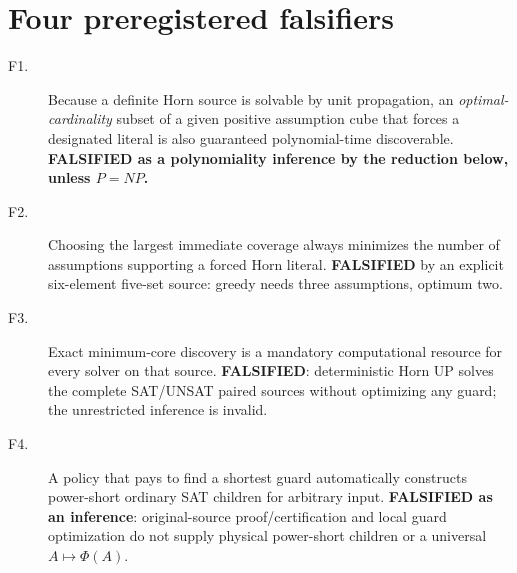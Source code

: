 \documentclass[11pt]{article}
\begin{document}
\section{Four preregistered falsifiers}
\begin{description}
\item[F1.] Because a definite Horn source is solvable by unit propagation, an \emph{optimal-cardinality} subset of a given positive assumption cube that forces a designated literal is also guaranteed polynomial-time discoverable. \textbf{FALSIFIED as a polynomiality inference by the reduction below, unless $P=NP$.}
\item[F2.] Choosing the largest immediate coverage always minimizes the number of assumptions supporting a forced Horn literal. \textbf{FALSIFIED} by an explicit six-element five-set source: greedy needs three assumptions, optimum two.
\item[F3.] Exact minimum-core discovery is a mandatory computational resource for every solver on that source. \textbf{FALSIFIED}: deterministic Horn UP solves the complete SAT/UNSAT paired sources without optimizing any guard; the unrestricted inference is invalid.
\item[F4.] A policy that pays to find a shortest guard automatically constructs power-short ordinary SAT children for arbitrary input. \textbf{FALSIFIED as an inference}: original-source proof/certification and local guard optimization do not supply physical power-short children or a universal $A\mapsto\Phi(A)$.
\end{description}
\end{document}
